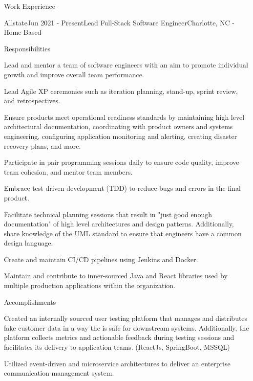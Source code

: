 \begin{basicSection}{Work Experience}
    \begin{workExperienceSection}{Allstate}{Jun 2021 - Present}{Lead Full-Stack Software Engineer}{Charlotte, NC - Home Based}
        \begin{workExperienceSectionSubSection}{Responsibilities}
            \item Lead and mentor a team of software engineers with an aim to promote individual growth and improve overall team performance.
            \item Lead Agile XP ceremonies such as iteration planning, stand-up, sprint review, and retrospectives.
            \item Ensure products meet operational readiness standards by maintaining high level architectural documentation, coordinating with product owners and systems engineering, configuring application monitoring and alerting, creating disaster recovery plans, and more.
            \item Participate in pair programming sessions daily to ensure code quality, improve team cohesion, and mentor team members.
            \item Embrace test driven development (TDD) to reduce bugs and errors in the final product.
            \item Facilitate technical planning sessions that result in "just good enough documentation" of high level architectures and design patterns.
            Additionally, share knowledge of the UML standard to ensure that engineers have a common design language.
            \item Create and maintain CI/CD pipelines using Jenkins and Docker.
            \item Maintain and contribute to inner-sourced Java and React libraries used by multiple production applications within the organization.
        \end{workExperienceSectionSubSection}
        \begin{workExperienceSectionSubSection}{Accomplishments}
            \item Created an internally sourced user testing platform that manages and distributes fake customer data in a way the is safe for downstream systems.
            Additionally, the platform collects metrics and actionable feedback during testing sessions and facilitates its delivery to application teams.
            (ReactJs, SpringBoot, MSSQL)
            \item Utilized event-driven and microservice architectures to deliver an enterprise communication management system.

\end{workExperienceSectionSubSection}
\end{workExperienceSection}
\end{basicSection}
